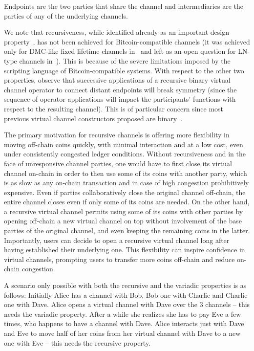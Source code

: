 Endpoints are the two parties that share the channel and intermediaries are
the parties of any of the underlying channels.

We note that recursiveness, while identified already as an important design
property~\cite{DBLP:conf/ccs/DziembowskiFH18}, has not been achieved for Bitcoin-compatible channels
(it was achieved only for DMC-like fixed lifetime channels in~\cite{10.1007/978-3-030-65411-5_18} and left as an open question for LN-type channels in~\cite{9519487}).
This is because of the severe limitations imposed by the scripting language of Bitcoin-compatible systems.
With respect to the other two properties, observe that successive applications
of a recursive binary virtual channel operator to connect distant endpoints will
break symmetry (since the sequence of operator applications will impact the
participants' functions with respect to the resulting channel). This is of
particular concern since most previous virtual channel constructors proposed are
binary~\cite{DBLP:conf/ccs/DziembowskiFH18,9519487,10.1007/978-3-030-65411-5_18}.

The primary motivation for recursive channels is offering more flexibility in
moving off-chain coins quickly, with minimal interaction and at a low cost, even
under consistently
congested ledger conditions. Without recursiveness and in the face of
unresponsive channel parties, one would have to first
close its virtual channel on-chain in order to then use some of its coins with
another party, which is as slow as any on-chain transaction and in case of high
congestion prohibitively expensive. Even if parties collaboratively
close the original channel off-chain, the entire
channel closes even if only some of its coins are needed. On the other hand, a
recursive
virtual channel permits using some of its coins with other parties by
opening off-chain a new virtual channel on top without involvement of the base parties of
the original channel, and even keeping the remaining coins in
the latter. Importantly, users can decide to open a recursive virtual channel
long after having established their underlying one. This flexibility can inspire confidence in virtual
channels, prompting users to transfer more coins off-chain and
reduce on-chain congestion.

A scenario only possible with both the recursive and the variadic
properties is as follows: Initially Alice has a channel with
Bob, Bob one with Charlie and Charlie one with Dave. Alice opens a virtual
channel with Dave over the $3$ channels -- this needs the variadic property.
After a while she realizes she has to pay Eve a few
times, who happens to have a channel with Dave. Alice interacts just with
Dave and Eve to move half of her coins from her virtual channel with Dave to a
new one with Eve -- this needs the recursive property.

